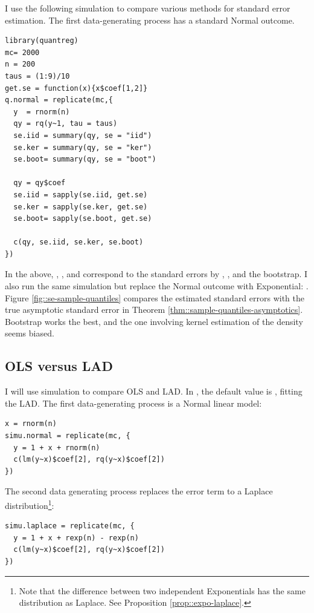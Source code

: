 I use the following simulation to compare various methods for standard error estimation. The first data-generating process has a standard Normal outcome. 

\begin{lstlisting}
library(quantreg)
mc= 2000
n = 200
taus = (1:9)/10
get.se = function(x){x$coef[1,2]}
q.normal = replicate(mc,{
  y  = rnorm(n)
  qy = rq(y~1, tau = taus)
  se.iid = summary(qy, se = "iid")
  se.ker = summary(qy, se = "ker")
  se.boot= summary(qy, se = "boot")
  
  qy = qy$coef
  se.iid = sapply(se.iid, get.se)
  se.ker = sapply(se.ker, get.se)
  se.boot= sapply(se.boot, get.se)
  
  c(qy, se.iid, se.ker, se.boot)
})
\end{lstlisting}


In the above, , , and  correspond to the standard errors by \citet{koenker1978regression}, \citet{powell1991estimation}, and the bootstrap. 
I also run the same simulation but replace the Normal outcome with Exponential: . Figure \ref{fig::se-sample-quantiles} compares the estimated standard errors with the true asymptotic standard error in Theorem \ref{thm::sample-quantiles-asymptotics}. Bootstrap works the best, and the one involving kernel estimation of the density seems biased. 






\subsection{OLS versus LAD}


I will use simulation to compare OLS and LAD. In , the default value is , fitting the LAD. The first data-generating process is a Normal linear model:

\begin{lstlisting}
x = rnorm(n)
simu.normal = replicate(mc, {
  y = 1 + x + rnorm(n)
  c(lm(y~x)$coef[2], rq(y~x)$coef[2])
})
\end{lstlisting}



The second data generating process replaces the error term to a Laplace distribution\footnote{Note that the difference between two independent Exponentials has the same distribution as Laplace. See Proposition \ref{prop::expo-laplace}.}:

\begin{lstlisting}
simu.laplace = replicate(mc, {
  y = 1 + x + rexp(n) - rexp(n)
  c(lm(y~x)$coef[2], rq(y~x)$coef[2])
})
\end{lstlisting}


